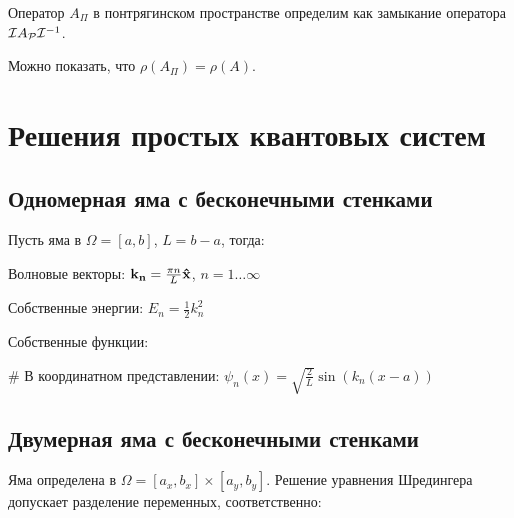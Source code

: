 Оператор $A_\Pi$ в понтрягинском пространстве определим как замыкание оператора $\mathcal{I} A_{\mathcal{P}} \mathcal{I}^{-1}$. 

Можно показать, что $\rho(A_\Pi) = \rho(A)$.





\section{Решения простых квантовых систем}
\subsection{Одномерная яма с бесконечными стенками}
Пусть яма в $\Omega = [a, b]$, $L = b - a$, тогда:

Волновые векторы: $\vb{k_n} = \frac{\pi n}{L} \vb{\hat{x}}$, $n = 1 \dots \infty$

Собственные энергии: $E_n = \frac{1}{2} k_n^2$

Собственные функции:
\begin{ilist}
# В координатном представлении: $\psi_n(x) = \sqrt{\frac{2}{L}} \sin(k_n (x - a))$
\end{ilist}

\subsection{Двумерная яма с бесконечными стенками}
Яма определена в $\Omega = [a_x, b_x] \times [a_y, b_y]$. Решение уравнения Шредингера допускает разделение переменных, соответственно:

